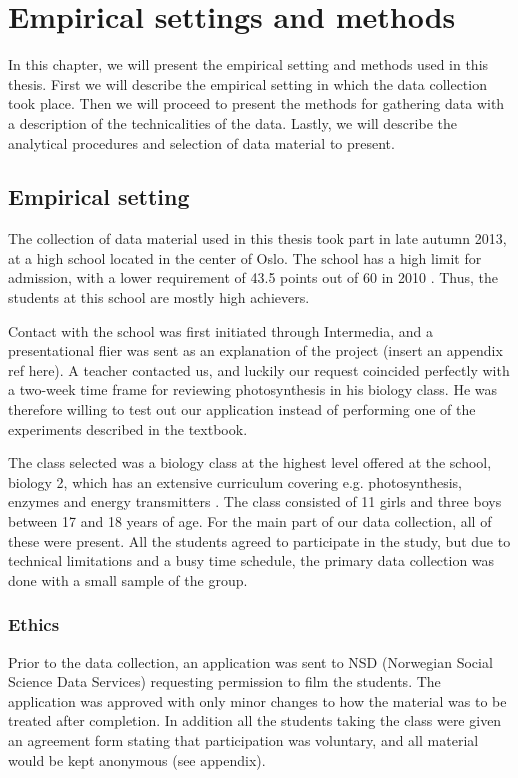 \chapter{Empirical settings and methods}
In this chapter, we will present the empirical setting and methods used in this thesis. First we will describe the empirical setting in which the data collection took place. Then we will proceed to present the methods for gathering data with a description of the technicalities of the data. Lastly, we will describe the analytical procedures and selection of data material to present.

\section{Empirical setting}
The collection of data material used in this thesis took part in late autumn 2013, at a high school located in the center of Oslo. The school has a high limit for admission, with a lower requirement of 43.5 points out of 60 in 2010 \citep{utdanningsetaten}. Thus, the students at this school are mostly high achievers. 

Contact with the school was first initiated through Intermedia, and a presentational flier was sent as an explanation of the project (insert an appendix ref here). A teacher contacted us, and luckily our request coincided perfectly with a two-week time frame for reviewing photosynthesis in his biology class. He was therefore willing to test out our application instead of performing one of the experiments described in the textbook. 

The class selected was a biology class at the highest level offered at the school, biology 2, which has an extensive curriculum covering e.g. photosynthesis, enzymes and energy transmitters \citep{bios}. The class consisted of 11 girls and three boys between 17 and 18 years of age. For the main part of our data collection, all of these were present. All the students agreed to participate in the study, but due to technical limitations and a busy time schedule, the primary data collection was  done with a small sample of the group. 

\subsection{Ethics}
Prior to the data collection, an application was sent to NSD (Norwegian Social Science Data Services) requesting permission to film the students. The application was approved with only minor changes to how the material was to be treated after completion. In addition all the students taking the class were given an agreement form stating that participation was voluntary, and all material would be kept anonymous (see appendix). 

